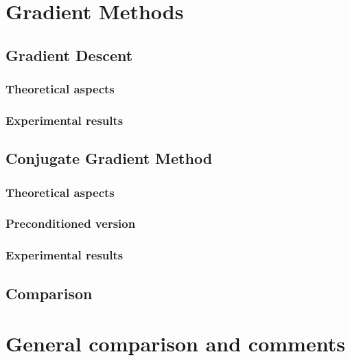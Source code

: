 \section{Gradient Methods}
	\subsection{Gradient Descent}
		\subsubsection{Theoretical aspects}
		\subsubsection{Experimental results}
	\subsection{Conjugate Gradient Method}
		\subsubsection{Theoretical aspects}
		\subsubsection{Preconditioned version}
		\subsubsection{Experimental results}
	\subsection{Comparison}
	
\section{General comparison and comments}